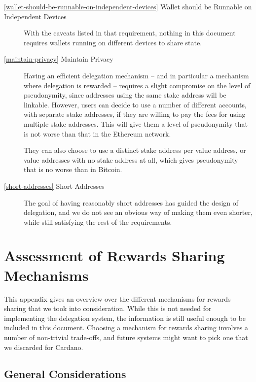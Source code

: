 \documentclass[11pt,a4paper,dvipsnames,twosided]{article}
\begin{document}
\begin{description}
\item[\cref{wallet-should-be-runnable-on-independent-devices} Wallet
  should be Runnable on Independent Devices] With the caveats listed
  in that requirement, nothing in this document requires wallets
  running on different devices to share state.

\item[\cref{maintain-privacy} Maintain Privacy] Having an efficient
  delegation mechanism -- and in particular a mechanism where
  delegation is rewarded -- requires a slight compromise on the level
  of pseudonymity, since addresses using the same stake address will be
  linkable. However, users can decide to use a number of different
  accounts, with separate stake addresses, if they are willing to pay the
  fees for using multiple stake addresses. This will give them a level of
  pseudonymity that is not worse than that in the Ethereum network.

  They can also choose to use a distinct stake address per value address, or
  value addresses with no stake address at all, which gives pseudonymity that is
  no worse than in Bitcoin.

\item[\cref{short-addresses} Short Addresses] The goal of having
  reasonably short addresses has guided the design of delegation, and
  we do not see an obvious way of making them even shorter, while
  still satisfying the rest of the requirements.

\end{description}

\appendix

\section{Assessment of Rewards Sharing Mechanisms}
\label{assessment-of-rewards-sharing-mechanisms}

This appendix gives an overview over the different mechanisms for
rewards sharing that we took into consideration. While this is not
needed for implementing the delegation system, the information is
still useful enough to be included in this document. Choosing a
mechanism for rewards sharing involves a number of non-trivial
trade-offs, and future systems might want to pick one that we
discarded for Cardano.

\subsection{General Considerations}
\label{general-considerations}
\end{document}

